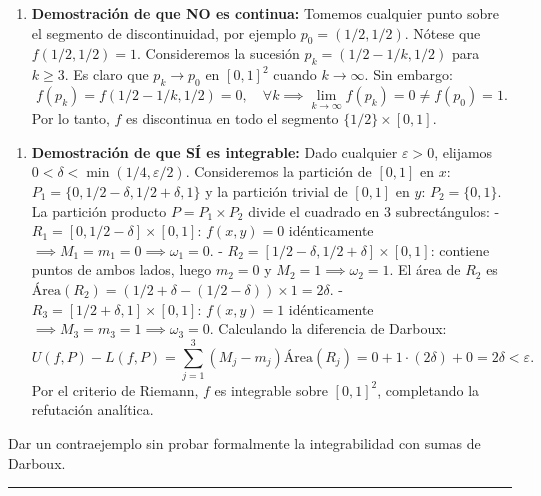 \documentclass[11pt,a4paper]{article}
\begin{document}
\begin{enumerate}[label=\textbf{\arabic*.}]
\item \textbf{Demostración de que NO es continua:}
Tomemos cualquier punto sobre el segmento de discontinuidad, por ejemplo $p_0 = (1/2, 1/2)$.
Nótese que $f(1/2, 1/2) = 1$.
Consideremos la sucesión $p_k = (1/2 - 1/k, 1/2)$ para $k \ge 3$.
Es claro que $p_k \to p_0$ en $[0,1]^2$ cuando $k \to \infty$.
Sin embargo:
\begin{equation*}
f(p_k) = f(1/2 - 1/k, 1/2) = 0, \quad \forall k \implies \lim_{k\to\infty} f(p_k) = 0 \neq f(p_0) = 1.
\end{equation*}
Por lo tanto, $f$ es discontinua en todo el segmento $\{1/2\} \times [0, 1]$.
\end{enumerate}

\begin{enumerate}[label=\textbf{\arabic*.}]
\item \textbf{Demostración de que SÍ es integrable:}
Dado cualquier $\varepsilon > 0$, elijamos $0 < \delta < \min(1/4, \varepsilon/2)$.
Consideremos la partición de $[0,1]$ en $x$: $P_1 = \{0, 1/2 - \delta, 1/2 + \delta, 1\}$ y la partición trivial de $[0,1]$ en $y$: $P_2 = \{0, 1\}$.
La partición producto $P = P_1 \times P_2$ divide el cuadrado en 3 subrectángulos:
- $R_1 = [0, 1/2 - \delta] \times [0, 1]$: $f(x,y) = 0$ idénticamente $\implies M_1 = m_1 = 0 \implies \omega_1 = 0$.
- $R_2 = [1/2 - \delta, 1/2 + \delta] \times [0, 1]$: contiene puntos de ambos lados, luego $m_2 = 0$ y $M_2 = 1 \implies \omega_2 = 1$.
  El área de $R_2$ es $\text{Área}(R_2) = (1/2 + \delta - (1/2 - \delta)) \times 1 = 2\delta$.
- $R_3 = [1/2 + \delta, 1] \times [0, 1]$: $f(x,y) = 1$ idénticamente $\implies M_3 = m_3 = 1 \implies \omega_3 = 0$.
Calculando la diferencia de Darboux:
\begin{equation*}
U(f, P) - L(f, P) = \sum_{j=1}^3 (M_j - m_j)\text{Área}(R_j) = 0 + 1 \cdot (2\delta) + 0 = 2\delta < \varepsilon.
\end{equation*}
Por el criterio de Riemann, $f$ es integrable sobre $[0,1]^2$, completando la refutación analítica.
\end{enumerate}

\begin{trapbox}
Dar un contraejemplo sin probar formalmente la integrabilidad con sumas de Darboux.
\end{trapbox}

\vspace{0.5cm}
\hrule
\vspace{0.5cm}
\end{document}
